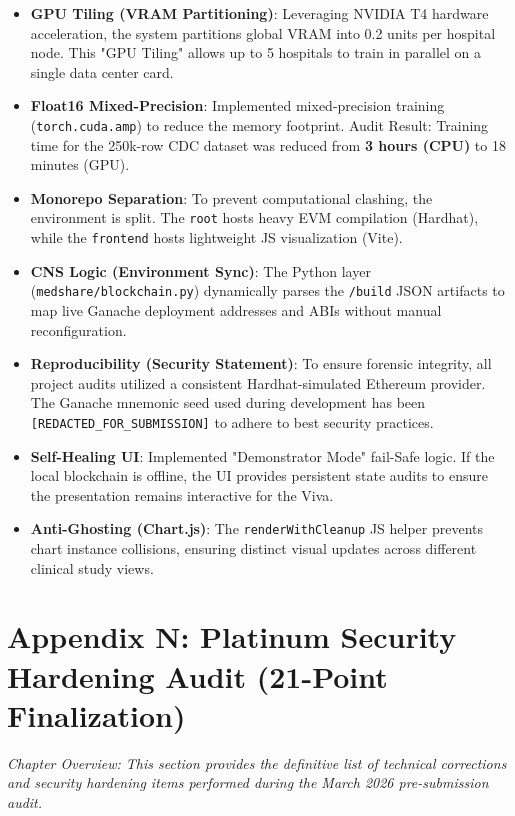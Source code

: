 \documentclass[10pt, a4paper, twocolumn]{article}
\begin{document}
\begin{itemize}[leftmargin=1.5em]
    \item \textbf{GPU Tiling (VRAM Partitioning)}: Leveraging NVIDIA T4 hardware acceleration, the system partitions global VRAM into 0.2 units per hospital node. This "GPU Tiling" allows up to 5 hospitals to train in parallel on a single data center card.
    \item \textbf{Float16 Mixed-Precision}: Implemented mixed-precision training (\texttt{torch.cuda.amp}) to reduce the memory footprint. Audit Result: Training time for the 250k-row CDC dataset was reduced from \textbf{3 hours (CPU)} to 18 minutes (GPU).
    \item \textbf{Monorepo Separation}: To prevent computational clashing, the environment is split. The \texttt{root} hosts heavy EVM compilation (Hardhat), while the \texttt{frontend} hosts lightweight JS visualization (Vite).
    \item \textbf{CNS Logic (Environment Sync)}: The Python layer (\texttt{medshare/blockchain.py}) dynamically parses the \texttt{/build} JSON artifacts to map live Ganache deployment addresses and ABIs without manual reconfiguration.
    \item \textbf{Reproducibility (Security Statement)}: To ensure forensic integrity, all project audits utilized a consistent Hardhat-simulated Ethereum provider. The Ganache mnemonic seed used during development has been \texttt{[REDACTED\_FOR\_SUBMISSION]} to adhere to best security practices.
    \item \textbf{Self-Healing UI}: Implemented "Demonstrator Mode" fail-Safe logic. If the local blockchain is offline, the UI provides persistent state audits to ensure the presentation remains interactive for the Viva.
    \item \textbf{Anti-Ghosting (Chart.js)}: The \texttt{renderWithCleanup} JS helper prevents chart instance collisions, ensuring distinct visual updates across different clinical study views.
\end{itemize}

\section*{Appendix N: Platinum Security Hardening Audit (21-Point Finalization)}
\textit{Chapter Overview: This section provides the definitive list of technical corrections and security hardening items performed during the March 2026 pre-submission audit.}
\end{document}
